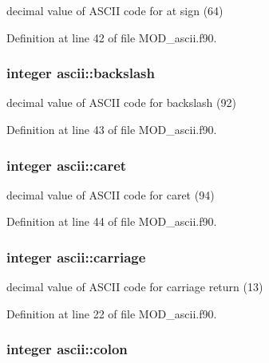 decimal value of A\-S\-C\-I\-I code for at sign (64) 



Definition at line 42 of file M\-O\-D\-\_\-ascii.\-f90.

\hypertarget{classascii_ab2fa5d3e44c7149695edb42bef470b7b}{
\subsubsection[{backslash}]{\setlength{\rightskip}{0pt plus 5cm}integer ascii\-::backslash}}\label{classascii_ab2fa5d3e44c7149695edb42bef470b7b}


decimal value of A\-S\-C\-I\-I code for backslash (92) 



Definition at line 43 of file M\-O\-D\-\_\-ascii.\-f90.

\hypertarget{classascii_a5dbe67952255c7a16e494e05547d7e3f}{
\subsubsection[{caret}]{\setlength{\rightskip}{0pt plus 5cm}integer ascii\-::caret}}\label{classascii_a5dbe67952255c7a16e494e05547d7e3f}


decimal value of A\-S\-C\-I\-I code for caret (94) 



Definition at line 44 of file M\-O\-D\-\_\-ascii.\-f90.

\hypertarget{classascii_a862703c2a4ceccfb0a296d3a8f00b2b1}{
\subsubsection[{carriage}]{\setlength{\rightskip}{0pt plus 5cm}integer ascii\-::carriage}}\label{classascii_a862703c2a4ceccfb0a296d3a8f00b2b1}


decimal value of A\-S\-C\-I\-I code for carriage return (13) 



Definition at line 22 of file M\-O\-D\-\_\-ascii.\-f90.

\hypertarget{classascii_ad2512b3c1ba1ee047cfb09f9d4e7663f}{
\subsubsection[{colon}]{\setlength{\rightskip}{0pt plus 5cm}integer ascii\-::colon}}\label{classascii_ad2512b3c1ba1ee047cfb09f9d4e7663f}


